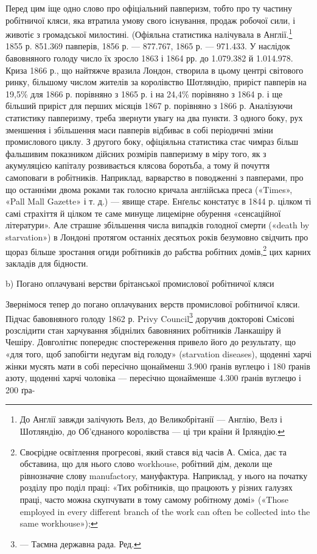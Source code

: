 Перед цим іще одно слово про офіціальний павперизм, тобто
про ту частину робітничої кляси, яка втратила умову свого існування,
продаж робочої сили, і животіє з громадської милостині.
(Офіяльна статистика налічувала в Англії.\footnote{
До Англії завжди залічують Велз, до Великобрітанії — Англію,
Велз і Шотляндію, до Об’єднаного королівства — ці три країни й Ірляндію.
} 1855 р. 851.369 павперів,
1856 р. — 877.767, 1865 р. — 971.433. У наслідок бавовняного
голоду число їх зросло 1863 і 1864 рр. до 1.079.382
й 1.014.978. Криза 1866 р., що найтяжче вразила Лондон, створила
в цьому центрі світового ринку, більшому числом жителів
за королівство Шотляндію, приріст павперів на 19,5\% для
1866 р. порівняно з 1865 р. і на 24,4\% порівняно з 1864 р. і ще
більший приріст для перших місяців 1867 р. порівняно з
1866 р. Аналізуючи статистику павперизму, треба звернути увагу
на два пункти. З одного боку, рух зменшення і збільшення маси
павперів відбиває в собі періодичні зміни промислового циклу.
З другого боку, офіціяльна статистика стає чимраз більш фальшивим
показником дійсних розмірів павперизму в міру того,
як з акумуляцією капіталу розвивається клясова боротьба, а
тому й почуття самоповаги в робітників. Наприклад, варварство
в поводженні з павперами, про що останніми двома роками так
голосно кричала англійська преса («Times», «Pall Mall Gazette»
і т. д.) — явище старе. Енґельс констатує в 1844 р. цілком
ті самі страхіття й цілком те саме минуще лицемірне обурення
«сенсаційної літератури». Але страшне збільшення числа випадків
голодної смерти («death by starvation») в Лондоні протягом
останніх десятьох років безумовно свідчить про щораз більше зростання
огиди робітників до рабства робітних домів,\footnote{
Своєрідне освітлення прогресові, який стався від часів А. Сміса,
дає та обставина, що для нього слово workhouse, робітний дім, деколи ще
рівнозначне слову manufactory, мануфактура. Наприклад, у нього на
початку розділу про поділ праці: «Тих робітників, що працюють у різних
галузях праці, часто можна скупчувати в тому самому робітному домі»
(«Those employed in every different branch of the work can often be collected
into the same workhouse»);
} цих карних
закладів для бідности.

b) Погано оплачувані верстви брітанської промислової робітничої кляси

Звернімося тепер до погано оплачуваних верств промислової
робітничої кляси. Підчас бавовняного голоду 1862 р. Privy
Council\footnote*{
— Таємна державна рада. Ред.
} доручив докторові Смісові розслідити стан харчування
збіднілих бавовняних робітників Ланкашіру й Чешіру. Довголітнє
попереднє спостереження привело його до результату, що
«для того, щоб запобігти недугам від голоду» (starvation diseases),
щоденні харчі жінки мусять мати в собі пересічно щонайменш
3.900 ґранів вуглецю і 180 ґранів азоту, щоденні харчі
чоловіка — пересічно щонайменше 4.300 ґранів вуглецю і 200 ґра-
\parbreak{}  %
